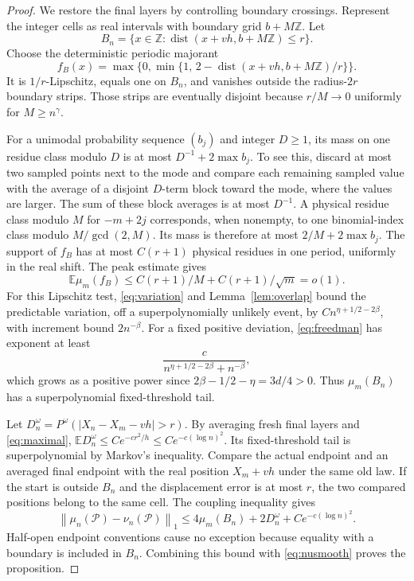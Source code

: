 \documentclass[11pt]{article}
\newcommand{\EE}{\mathbb E}
\newcommand{\ZZ}{\mathbb Z}
\newcommand{\cP}{\mathcal P}
\newcommand{\norm}[1]{\left\lVert#1\right\rVert_1}
\begin{document}
\begin{proof}
We restore the final layers by controlling boundary crossings.
Represent the integer cells as real intervals with boundary grid
$b+M\ZZ$. Let
\[
 B_n=\{x\in\ZZ:\operatorname{dist}(x+vh,b+M\ZZ)\leq r\}.
\]
Choose the deterministic periodic majorant
\[
 f_B(x)=\max\{0,\min\{1,\,
                2-\operatorname{dist}(x+vh,b+M\ZZ)/r\}\}.
\]
It is $1/r$-Lipschitz, equals one on $B_n$, and vanishes outside
the radius-$2r$ boundary strips. Those strips are eventually
disjoint because $r/M\to0$ uniformly for $M\geq n^\gamma$.

For a unimodal probability sequence $(b_j)$ and integer $D\geq1$,
its mass on one residue class modulo $D$ is at most
$D^{-1}+2\max b_j$. To see this, discard at most two sampled
points next to the mode and compare each remaining sampled value
with the average of a disjoint $D$-term block toward the mode,
where the values are larger. The sum of these block averages
is at most $D^{-1}$.
A physical residue class modulo $M$ for $-m+2j$ corresponds,
when nonempty, to one binomial-index class modulo
$M/\gcd(2,M)$. Its mass is therefore at most
$2/M+2\max b_j$. The support of $f_B$ has at most $C(r+1)$
physical residues in one period, uniformly in the real shift.
The peak estimate gives
\[
       \EE\mu_m(f_B)\leq C(r+1)/M+C(r+1)/\sqrt m=o(1).
\]
For this Lipschitz test, \eqref{eq:variation} and
Lemma~\ref{lem:overlap} bound the predictable variation, off a
superpolynomially unlikely event, by
$Cn^{\eta+1/2-2\beta}$, with increment bound $2n^{-\beta}$.
For a fixed positive deviation, \eqref{eq:freedman} has exponent
at least
\[
        \frac{c}{n^{\eta+1/2-2\beta}+n^{-\beta}},
\]
which grows as a positive power since
$2\beta-1/2-\eta=3d/4>0$.
Thus $\mu_m(B_n)$ has a superpolynomial fixed-threshold tail.

Let
$D_n^\omega=P^\omega(|X_n-X_m-vh|>r)$.
By averaging fresh final layers and \eqref{eq:maximal},
$\EE D_n^\omega\leq Ce^{-cr^2/h}\leq Ce^{-c(\log n)^2}$.
Its fixed-threshold tail is superpolynomial by Markov's inequality.
Compare the actual endpoint and an averaged final endpoint with the
real position $X_m+vh$ under the same old law. If the start is outside
$B_n$ and the displacement error is at most $r$, the two compared
positions belong to the same cell. The coupling inequality gives
\[
 \norm{\mu_n(\cP)-\nu_n(\cP)}
       \leq4\mu_m(B_n)+2D_n^\omega+Ce^{-c(\log n)^2}.
\]
Half-open endpoint conventions cause no exception because equality
with a boundary is included in $B_n$.
Combining this bound with \eqref{eq:nusmooth} proves the proposition.
\end{proof}
\end{document}
